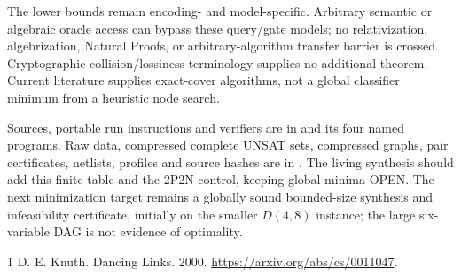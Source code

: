 \documentclass[11pt]{article}
\begin{document}
The lower bounds remain encoding- and model-specific. Arbitrary semantic or
algebraic oracle access can bypass these query/gate models; no relativization,
algebrization, Natural Proofs, or arbitrary-algorithm transfer barrier is crossed.
Cryptographic collision/lossiness terminology supplies no additional theorem.
Current literature supplies exact-cover algorithms, not a global classifier
minimum from a heuristic node search.

Sources, portable run instructions and verifiers are in
 and its four named programs.
Raw data, compressed complete UNSAT sets, compressed graphs, pair certificates,
netlists, profiles and source hashes are in
.
The living synthesis should add this finite table and the 2P2N control, keeping
global minima OPEN. The next minimization target remains a globally sound
bounded-size synthesis and infeasibility certificate, initially on the smaller
$D(4,8)$ instance; the large six-variable DAG is not evidence of optimality.

\begin{thebibliography}{1}
 D. E. Knuth. Dancing Links. 2000.
\url{https://arxiv.org/abs/cs/0011047}.
\end{thebibliography}
\end{document}
